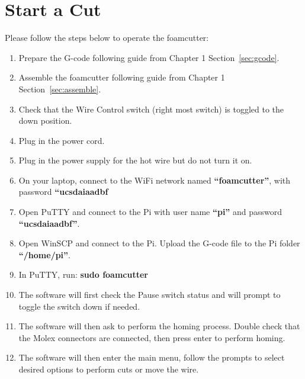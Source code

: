 \documentclass[titlepage,12pt,letter]{report}
\numberwithin{equation}{chapter}
\begin{document}
\section{Start a Cut}
Please follow the steps below to operate the foamcutter:
\begin{enumerate}[itemsep = 5pt,topsep=0pt]
	\item Prepare the G-code following guide from Chapter 1 Section~\ref{sec:gcode}.
	\item Assemble the foamcutter following guide from Chapter 1 Section~\ref{sec:assemble}.
	\item Check that the Wire Control switch (right most switch) is toggled to the down position.
	\item Plug in the power cord.
	\item Plug in the power supply for the hot wire but do not turn it on.
	\item On your laptop, connect to the WiFi network named \textbf{``foamcutter''}, with password \textbf{``ucsdaiaadbf}
	\item Open PuTTY and connect to the Pi with user name \textbf{``pi''} and password \\ \textbf{``ucsdaiaadbf''}.
	\item Open WinSCP and connect to the Pi. Upload the G-code file to the Pi folder \\ \textbf{``/home/pi''}.
	\item In PuTTY, run: \textbf{sudo foamcutter}
	\item The software will first check the Pause switch status and will prompt to toggle the switch down if needed.
	\item The software will then ask to perform the homing process. Double check that the Molex connectors are connected, then press enter to perform homing. 
	\item The software will then enter the main menu, follow the prompts to select desired options to perform cuts or move the wire.
\end{enumerate}
\end{document}
